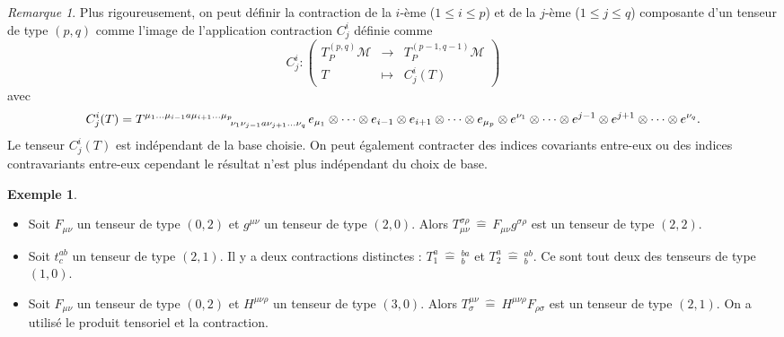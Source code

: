 \documentclass[a4paper,11pt]{report}
\theoremstyle{definition}
\theoremstyle{plain}
\theoremstyle{definition}
\newtheorem{exmp}{Exemple}[chapter]
\theoremstyle{remark}
\newtheorem{rmk}{Remarque}[chapter]
\newcommand{\M}{\mathscr{M}}
\begin{document}
                \begin{rmk}
                    Plus rigoureusement, on peut définir la contraction de la $i$-ème ($1\leq i\leq p$) et de la $j$-ème ($1\leq j\leq q$) composante d'un tenseur de type $(p,q)$ comme l'image de l'application contraction $C^i_j$ définie comme
                    \begin{equation}
                        C^i_j:\left(
                    \begin{array}{ccc}
                        T^{(p,q)}_P\M & \longrightarrow & T^{(p-1,q-1)}_P\M \\
                        T & \longmapsto & C^i_j(T)
                    \end{array}
                    \right)
                    \end{equation}
                    avec 
                    \begin{equation}
                        C^i_j(T) = T\indices{^{\mu_1\dots\mu_{i-1}a\mu_{i+1}\dots\mu_p}_{\nu_1\nu_{j-1}a\nu_{j+1}\dots\nu_q}} e_{\mu_1}\otimes\dots\otimes e_{i-1}\otimes  e_{i+1}\otimes\dots\otimes e_{\mu_p}\otimes e^{\nu_1}\otimes\dots\otimes e^{j-1}\otimes e^{j+1}\otimes\dots\otimes e^{\nu_q}.
                    \end{equation}
                    Le tenseur $C^i_j(T)$ est indépendant de la base choisie. On peut également contracter des indices covariants entre-eux ou des indices contravariants entre-eux cependant le résultat n'est plus indépendant du choix de base.
                \end{rmk}
                
                \begin{exmp}${}$
                    \begin{itemize}[label = \textbullet]
                        \item Soit $F_{\mu\nu}$ un tenseur de type $(0,2)$ et $g^{\mu\nu}$ un tenseur de type $(2,0)$. Alors $T_{\mu\nu}^{\sigma\rho}~\hat{=}~F_{\mu\nu}g^{\sigma\rho}$ est un tenseur de type $(2,2)$.
                        \item Soit $t^{ab}_{c}$ un tenseur de type $(2,1)$. Il y a deux contractions distinctes : $T_1^a~\hat{=}~^{ba}_b$ et $T_2^a~\hat{=}~^{ab}_b$. Ce sont tout deux des tenseurs de type $(1,0)$.
                        \item Soit $F_{\mu\nu}$ un tenseur de type $(0,2)$ et $H^{\mu\nu\rho}$ un tenseur de type $(3,0)$. Alors $T^{\mu\nu}_{\sigma}~\hat{=}~H^{\mu\nu\rho}F_{\rho\sigma}$ est un tenseur de type $(2,1)$. On a utilisé le produit tensoriel et la contraction.
                    \end{itemize}
                \end{exmp}
                
\end{document}
